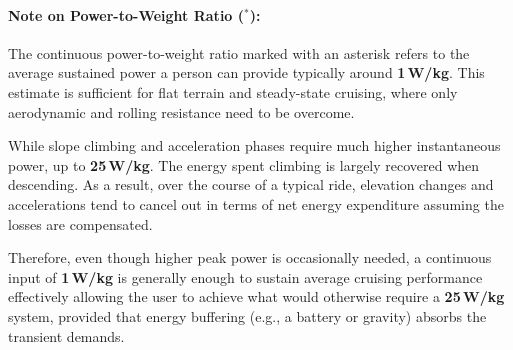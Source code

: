 \paragraph*{Note on Power-to-Weight Ratio ($^*$):}
The continuous power-to-weight ratio marked with an asterisk refers to the average sustained power a person can provide typically around \textbf{1\,W/kg}. This estimate is sufficient for flat terrain and steady-state cruising, where only aerodynamic and rolling resistance need to be overcome.

While slope climbing and acceleration phases require much higher instantaneous power, up to \textbf{25\,W/kg}. The energy spent climbing is largely recovered when descending. As a result, over the course of a typical ride, elevation changes and accelerations tend to cancel out in terms of net energy expenditure assuming the losses are compensated. 

Therefore, even though higher peak power is occasionally needed, a continuous input of \textbf{1\,W/kg} is generally enough to sustain average cruising performance effectively allowing the user to achieve what would otherwise require a \textbf{25\,W/kg} system, provided that energy buffering (e.g., a battery or gravity) absorbs the transient demands.
